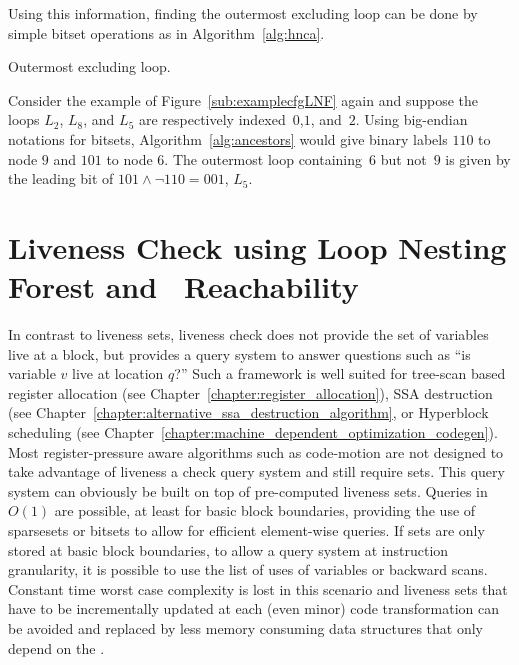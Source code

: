 Using this information, finding the outermost excluding loop can be done by simple bitset operations as in Algorithm~\ref{alg:hnca}.

\begin{algorithm}
\caption{Outermost excluding loop.}
\label{alg:hnca}
\end{algorithm}

\begin{example}
	Consider the example of Figure~\ref{sub:examplecfgLNF} again and suppose the loops $L_2$, $L_8$, and $L_5$ are respectively indexed~$0$,$1$, and~$2$.
	Using big-endian notations for bitsets, Algorithm~\ref{alg:ancestors} would give binary labels $110$ to node $9$ and $101$ to node $6$.
	The outermost loop containing~$6$ but not~$9$ is given by the leading bit of $101\wedge \lnot 110=001$, \ie $L_5$.
\end{example}



\section{Liveness Check using Loop Nesting Forest and \Reduced\ Reachability}
\label{sec:live-check}


In contrast to liveness sets, liveness check does not provide the set of variables live at a block, but provides a query system to answer questions such as ``is variable $v$ live at location $q$?''
Such a framework is well suited for tree-scan based register allocation (see Chapter~\ref{chapter:register_allocation}), SSA destruction (see Chapter~\ref{chapter:alternative_ssa_destruction_algorithm}, or Hyperblock scheduling (see Chapter~\ref{chapter:machine_dependent_optimization_codegen}).
Most register-pressure aware algorithms such as code-motion are not designed to take advantage of liveness a check query system and still require sets.
This query system can obviously be built on top of pre-computed liveness sets.
Queries in $O(1)$ are possible, at least for basic block boundaries, providing the use of sparsesets or bitsets to allow for efficient element-wise queries.
If sets are only stored at basic block boundaries, to allow a query system at instruction granularity, it is possible to use the list of uses of variables or backward scans.
Constant time worst case complexity is lost in this scenario and liveness sets that have to be incrementally updated at each (even minor) code transformation can be avoided and replaced by less memory consuming data structures that only depend on the \@CFG.

